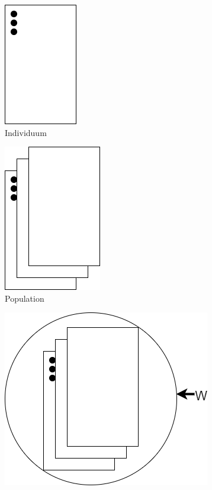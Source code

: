 \begin{figure}[!htb]
\begin{subfigure}{.3\textwidth}
	\centering
	\includegraphics[width=.4\linewidth]{img/rechenberg_notation/individuum.png}
	\caption{Individuum}
	\label{fig:individuum}
\end{subfigure}
\begin{subfigure}{.3\textwidth}
	\centering
	\includegraphics[width=.5\linewidth]{img/rechenberg_notation/population.png}
	\caption{Population}
	\label{fig:population}
\end{subfigure}
\begin{subfigure}{.3\textwidth}
	\centering
	\includegraphics[width=.7\linewidth]{img/rechenberg_notation/auswahl_gleichverteilt.png}

\end{subfigure}
\end{figure}
